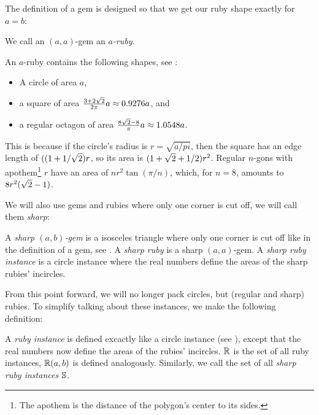 \documentclass[a4paper,style=print,oneside,bibliography=totoc,nexus,lnum,extramargin]{tubsbook}
\begin{document}

The definition of a gem is designed so that we get our ruby shape exactly for $a = b$:

\begin{definition}
    We call an $(a,a)$-gem an \emph{$a$-ruby}.
\end{definition}

An $a$-ruby contains the following shapes, see :

\begin{itemize}
    \item A circle of area $a$,
    \item a square of area $\frac{3+2\sqrt{2}}{2\pi}a \approx 0.9276a$, and
    \item a regular octagon of area $\frac{8\sqrt{2}-8}{\pi}a \approx 1.0548a$.
\end{itemize}

This is because if the circle's radius is $r = \sqrt{a/pi}$, then the square has an edge length of $((1+1/\sqrt{2})r$, so its area is $(1+\sqrt{2}+1/2)r^2$. Regular $n$-gons with apothem\footnote{The apothem is the distance of the polygon's center to its sides.} $r$ have an area of $nr^2\tan(\pi/n)$, which, for $n=8$, amounts to $8r^2(\sqrt{2}-1)$.


We will also use gems and rubies where only one corner is cut off, we will call them \emph{sharp}:

\begin{definition}
    A \emph{sharp $(a,b)$-gem} is a isosceles triangle where only one corner is cut off like in the definition of a gem, see . A \emph{sharp ruby} is a sharp $(a,a)$-gem. A \emph{sharp ruby instance} is a circle instance where the real numbers define the areas of the sharp rubies' incircles.
\end{definition}


From this point forward, we will no longer pack circles, but (regular and sharp) rubies. To simplify talking about these instances, we make the following definition:

\begin{definition}
    A \emph{ruby instance} is defined excactly like a circle instance (see ), except that the real numbers now define the areas of the rubies' incircles. $\mathbb{R}$ is the set of all ruby instances, $\mathbb{R}(a,b)$ is defined analogously.
    Similarly, we call the set of all \emph{sharp ruby instances} $\mathbb{S}$.
\end{definition}
\end{document}

